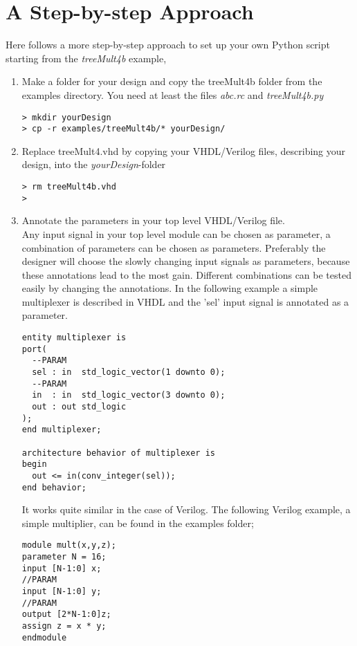 \documentclass[a4paper]{memoir}
\begin{document}
\section{A Step-by-step Approach}\label{sec:step_by_step}
Here follows a more step-by-step approach to set up your own Python script starting from the \emph{treeMult4b} example,
\begin{enumerate}
\item Make a folder for your design and copy the treeMult4b folder from the examples directory. You need at least the files \emph{abc.rc} and \emph{treeMult4b.py}\\
\begin{lstlisting}
> mkdir yourDesign
> cp -r examples/treeMult4b/* yourDesign/
\end{lstlisting}
\item Replace treeMult4.vhd by copying your VHDL/Verilog files, describing your design, into the \emph{yourDesign}-folder\\
\begin{lstlisting}
> rm treeMult4b.vhd
> 
\end{lstlisting}
\item Annotate the parameters in your top level VHDL/Verilog file.\\Any input signal in your top level module can be chosen as parameter, a combination of parameters can be chosen as parameters. Preferably the designer will choose the slowly changing input signals as parameters, because these annotations lead to the most gain. Different combinations can be tested easily by changing the annotations. In the following example a simple multiplexer is described in VHDL and the 'sel' input signal is annotated as a parameter.
\lstset{language=VHDL}
\begin{lstlisting}
entity multiplexer is
port(
  --PARAM
  sel : in  std_logic_vector(1 downto 0);
  --PARAM
  in  : in  std_logic_vector(3 downto 0);
  out : out std_logic
);
end multiplexer;

architecture behavior of multiplexer is
begin
  out <= in(conv_integer(sel));
end behavior;
\end{lstlisting}
It works quite similar in the case of Verilog. The following Verilog example, a simple multiplier, can be found in the examples folder;
\lstset{language=Verilog}
\begin{lstlisting}
module mult(x,y,z);
parameter N = 16;
input [N-1:0] x;
//PARAM
input [N-1:0] y;
//PARAM
output [2*N-1:0]z;
assign z = x * y;
endmodule
\end{lstlisting}
 

\end{enumerate}
\end{document}
